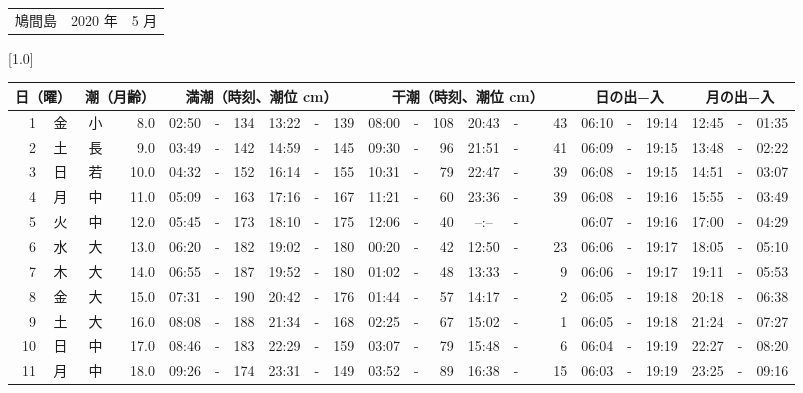 \documentclass[12pt,a4j]{jsarticle}
\begin{document}
 \begin{table}[htbp]
 \begin{center}
 \begin{tabular}{lcc}
 \LARGE{鳩間島}  & \large{2020 年} & \large{ 5 月} \\
 \end{tabular}
 \end{center}
 \begin{center}
    \scalebox{0.7}[1.0]{
    \begin{tabular}{|rc|cr|ccrccr|ccrccr|ccc|ccc|}
    \hline
    \multicolumn{2}{|c|}{日（曜）} & \multicolumn{2}{c|}{潮（月齢）} & \multicolumn{6}{c|}{満潮（時刻、潮位 cm）} & \multicolumn{6}{c|}{干潮（時刻、潮位 cm）} & \multicolumn{3}{c|}{日の出−入} &  \multicolumn{3}{c|}{月の出−入}\\
 \hline
 1 & 金 & 小 &  8.0 &  02:50 &-& 134 &  13:22 &-& 139 &  08:00 &-& 108 &  20:43 &-&  43 & 06:10 & -& 19:14 & 12:45 & -& 01:35 \\
 2 & 土 & 長 &  9.0 &  03:49 &-& 142 &  14:59 &-& 145 &  09:30 &-&  96 &  21:51 &-&  41 & 06:09 & -& 19:15 & 13:48 & -& 02:22 \\
 3 & 日 & 若 & 10.0 &  04:32 &-& 152 &  16:14 &-& 155 &  10:31 &-&  79 &  22:47 &-&  39 & 06:08 & -& 19:15 & 14:51 & -& 03:07 \\
 4 & 月 & 中 & 11.0 &  05:09 &-& 163 &  17:16 &-& 167 &  11:21 &-&  60 &  23:36 &-&  39 & 06:08 & -& 19:16 & 15:55 & -& 03:49 \\
 5 & 火 & 中 & 12.0 &  05:45 &-& 173 &  18:10 &-& 175 &  12:06 &-&  40 &  --:-- &-&~~~~~ & 06:07 & -& 19:16 & 17:00 & -& 04:29 \\
 6 & 水 & 大 & 13.0 &  06:20 &-& 182 &  19:02 &-& 180 &  00:20 &-&  42 &  12:50 &-&  23 & 06:06 & -& 19:17 & 18:05 & -& 05:10 \\
 7 & 木 & 大 & 14.0 &  06:55 &-& 187 &  19:52 &-& 180 &  01:02 &-&  48 &  13:33 &-&   9 & 06:06 & -& 19:17 & 19:11 & -& 05:53 \\
 8 & 金 & 大 & 15.0 &  07:31 &-& 190 &  20:42 &-& 176 &  01:44 &-&  57 &  14:17 &-&   2 & 06:05 & -& 19:18 & 20:18 & -& 06:38 \\
 9 & 土 & 大 & 16.0 &  08:08 &-& 188 &  21:34 &-& 168 &  02:25 &-&  67 &  15:02 &-&   1 & 06:05 & -& 19:18 & 21:24 & -& 07:27 \\
10 & 日 & 中 & 17.0 &  08:46 &-& 183 &  22:29 &-& 159 &  03:07 &-&  79 &  15:48 &-&   6 & 06:04 & -& 19:19 & 22:27 & -& 08:20 \\
11 & 月 & 中 & 18.0 &  09:26 &-& 174 &  23:31 &-& 149 &  03:52 &-&  89 &  16:38 &-&  15 & 06:03 & -& 19:19 & 23:25 & -& 09:16 \\

\end{tabular}}
\end{center}
\end{table}
\end{document}

